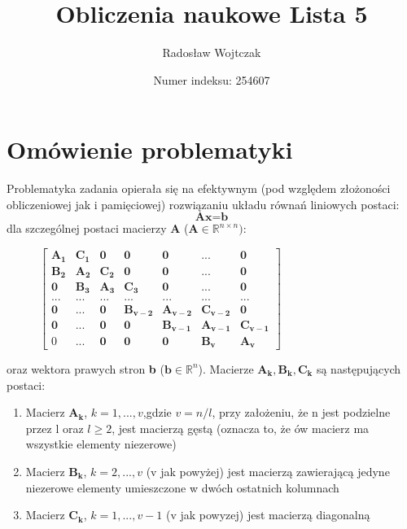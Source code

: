 \documentclass[a4paper,14pt]{report}
\title{Obliczenia naukowe Lista 5}
\author{Radosław Wojtczak}
\date{Numer indeksu: 254607}
\begin{document}
\maketitle
\tableofcontents
\chapter{Omówienie problematyki}
  Problematyka zadania opierała się na efektywnym (pod względem złożoności obliczeniowej jak i pamięciowej) rozwiązaniu układu równań liniowych postaci:
  \begin{equation}
    \textbf{Ax}=\textbf{b}
  \end{equation} 
  dla szczególnej postaci macierzy \textbf{A} ($\mathbf{A} \in \mathbb{R}^{n \times n})$: \\
  \begin{figure}[H]
  \centering
  $ \begin{bmatrix}
    \mathbf{A_1} & \mathbf{C_1} & \mathbf{0} & \mathbf{0} & \mathbf{0} & \mathbf{...} & \mathbf{0} \\
    \mathbf{B_2} & \mathbf{A_2} & \mathbf{C_2} & \mathbf{0} & \mathbf{0} & \mathbf{...} & \mathbf{0} \\
    \mathbf{0} & \mathbf{B_3} & \mathbf{A_3} & \mathbf{C_3} & \mathbf{0} & \mathbf{...} & \mathbf{0} \\
    \mathbf{...} & \mathbf{...} & \mathbf{...} & \mathbf{...} & \mathbf{...} & \mathbf{...} & \mathbf{...} \\
    \mathbf{0} & \mathbf{...} & \mathbf{0} & \mathbf{B_{v-2}} & \mathbf{A_{v-2}} & \mathbf{C_{v-2}} & \mathbf{0} \\
    \mathbf{0} & \mathbf{...} & \mathbf{0} & \mathbf{0} & \mathbf{B_{v-1}} & \mathbf{A_{v-1}} & \mathbf{C_{v-1}} \\
    \mathbf{}0 & \mathbf{...} & \mathbf{0} & \mathbf{0} & \mathbf{0} & \mathbf{B_{v}} & \mathbf{A_{v}} 
  \end{bmatrix}  $  
  \end{figure}
  oraz wektora prawych stron \textbf{b} ($\mathbf{b} \in \mathbb{R}^{n}$). Macierze $\mathbf{A_{k},B_{k},C_{k}}$ są następujących postaci:
  \begin{enumerate}
    \item Macierz $\mathbf{A_{k}}$, $k =1,...,v$,gdzie $v=n/l$, przy założeniu, że n jest podzielne przez l oraz $l \geq 2$, jest macierzą gęstą (oznacza to, że ów macierz ma wszystkie elementy niezerowe)
    \item Macierz $\mathbf{B_{k}}$, $k=2,...,v$ (v jak powyżej) jest macierzą zawierającą jedyne niezerowe elementy umieszczone w dwóch ostatnich kolumnach
    \item Macierz $\mathbf{C_{k}}$, $k=1,...,v-1$ (v jak powyzej) jest macierzą diagonalną

  \end{enumerate}
\end{document}
